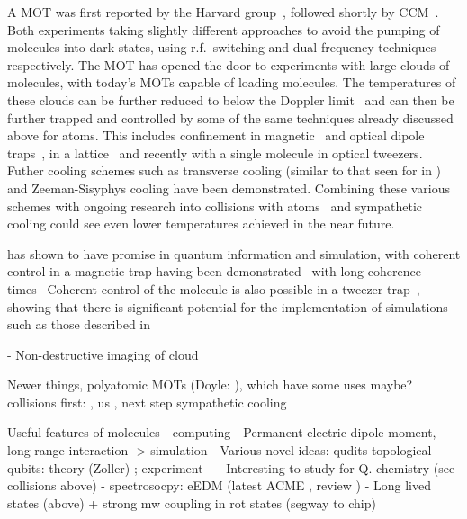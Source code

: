 A \CaF{} MOT was first reported by the Harvard
group~\cite{PhysRevLett.119.103201}, followed shortly by CCM~\cite{}. Both
experiments taking slightly different approaches to avoid the pumping of
molecules into dark states, using r.f.\ switching and dual-frequency techniques
respectively. The \CaF{} MOT has opened the door to experiments with large
clouds of \CaF{} molecules, with today's MOTs capable of loading 
molecules. The temperatures of these clouds can be further reduced to below the
Doppler limit~\cite{Truppe2017, PhysRevLett.123.033202} and can then be further
trapped and controlled by some of the same techniques already discussed above
for atoms. This includes confinement in magnetic~\cite{WilliamsMagnetic2018}
and optical dipole traps~\cite{}, in a
lattice~\cite{} and recently with a single \CaF{} molecule in optical
tweezers. Futher cooling schemes such as transverse
cooling (similar to that seen for \YbF in ) and
Zeeman-Sisyphys cooling have been demonstrated\cite{Fitch2016,
PhysRevLett.127.263002}. Combining these various schemes with ongoing research
into collisions with atoms~\cite{PhysRevLett.126.153401} and sympathetic
cooling could see even lower \CaF{} temperatures achieved in the near future.

\CaF{} has shown to have promise in quantum information and simulation, with
coherent control in a magnetic trap having been
demonstrated~\cite{WilliamsMagnetic2018, Blackmore_2018} with long coherence
times~\cite{PhysRevLett.124.063001}  Coherent control of the
molecule is also possible in a tweezer trap~\cite{PhysRevLett.127.123202},
showing that there is significant potential for the implementation of
simulations such as those described in 


- Non-destructive imaging of cloud \cite{PhysRevLett.121.083201}

Newer things, polyatomic MOTs (Doyle: \cite{Vilas2021}), which have some uses maybe? ~\cite{DoylePolyatomic2022}
collisions first: \cite{son2019collisional}, us \cite{Jurgilas2021, JurgilasPRL_2021}, next step sympathetic cooling

Useful features of molecules
- computing \cite{PhysRevLett.88.067901}
- Permanent electric dipole moment, long range interaction -> simulation
- Various novel ideas:
   qudits \cite{Sawant_2020}
   topological qubits: theory (Zoller) \cite{Micheli2006};  experiment ~\cite{Gross995}
- Interesting to study for Q. chemistry (see collisions above)
- spectrosocpy: eEDM
(latest ACME \cite{Andreev2018}, review \cite{ACMEreview})
- Long lived states (above) + strong mw coupling in rot states (segway to chip)


